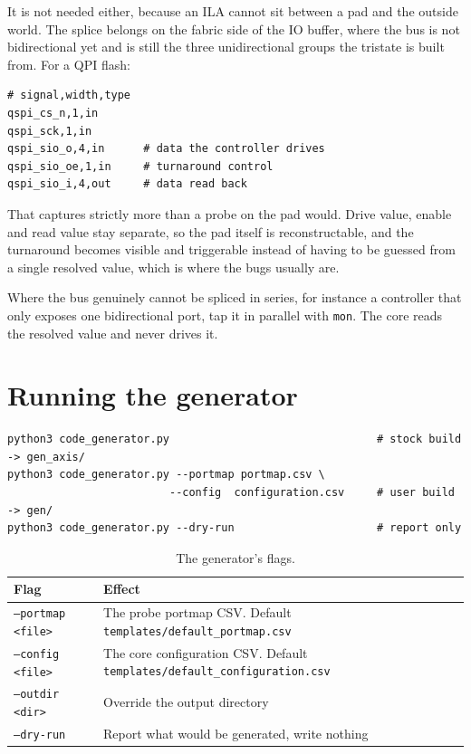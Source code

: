 \documentclass[../manual.tex]{subfiles}
\begin{document}
It is not needed either, because an ILA cannot sit between a pad and the outside world. The splice belongs on the fabric side of the IO buffer, where the bus is not bidirectional yet and is still the three unidirectional groups the tristate is built from. For a QPI flash:

\begin{lstlisting}
# signal,width,type
qspi_cs_n,1,in
qspi_sck,1,in
qspi_sio_o,4,in      # data the controller drives
qspi_sio_oe,1,in     # turnaround control
qspi_sio_i,4,out     # data read back
\end{lstlisting}

That captures strictly more than a probe on the pad would. Drive value, enable and read value stay separate, so the pad itself is reconstructable, and the turnaround becomes visible and triggerable instead of having to be guessed from a single resolved value, which is where the bugs usually are.

Where the bus genuinely cannot be spliced in series, for instance a controller that only exposes one bidirectional port, tap it in parallel with \texttt{mon}. The core reads the resolved value and never drives it.

\section{Running the generator}
\label{sec:codegen_running}

\begin{lstlisting}
python3 code_generator.py                                # stock build -> gen_axis/
python3 code_generator.py --portmap portmap.csv \
                         --config  configuration.csv     # user build  -> gen/
python3 code_generator.py --dry-run                      # report only
\end{lstlisting}

\begin{table}[H]
    \centering
    \begin{tabularx}{\textwidth}{|l|X|}
        \hline
        \rowcolor{gray!40} \textbf{Flag} & \textbf{Effect} \\
        \hline
        \texttt{--portmap <file>} & The probe portmap CSV. Default \texttt{templates/default\_portmap.csv} \\
        \hline
        \texttt{--config <file>} & The core configuration CSV. Default \texttt{templates/default\_configuration.csv} \\
        \hline
        \texttt{--outdir <dir>} & Override the output directory \\
        \hline
        \texttt{--dry-run} & Report what would be generated, write nothing \\
        \hline
    \end{tabularx}
    \caption{The generator's flags.}
    \label{tab:codegen_flags}
\end{table}
\end{document}
